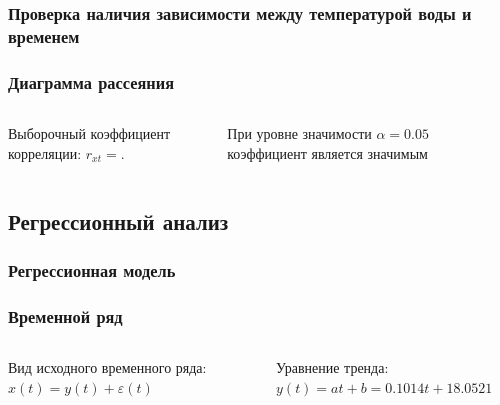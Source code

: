 \documentclass[10pt, pdf,aspectratio=169]{beamer}
\newcommand{\inp}[1]{}
\newcommand{\characteristic}[2]{\inp{#1/characteristics/#2}}
\begin{document}
\subsubsection{Проверка наличия зависимости между температурой воды и временем}
\begin{frame}
  \frametitle{Диаграмма рассеяния}   %
  \begin{columns}[c]
  \column{2in}  %
  Выборочный коэффициент корреляции: $ r_{xt} = \characteristic{original}{correlation} $.

  При уровне значимости $ \alpha=0.05 $ коэффициент является значимым
  \column{3in}
  \end{columns}
\end{frame}

\subsection{Регрессионный анализ}

\subsubsection{Регрессионная модель}
\begin{frame}
  \frametitle{Временной ряд}   %
  \begin{columns}[c]
  \column{2in}  %
  Вид исходного временного ряда: $x(t) = y(t) + \varepsilon(t)$

  Уравнение тренда: $ y(t) = at + b = 0.1014t + 18.0521 $
  \column{3in}
  \end{columns}
\end{frame}
\end{document}
